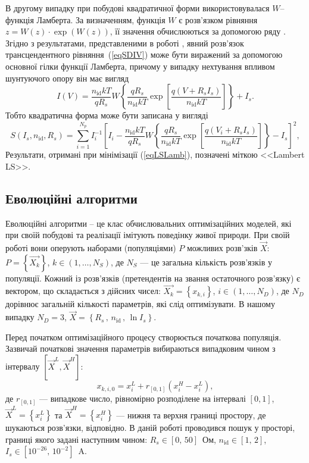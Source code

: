 В другому випадку при побудові квадратичної форми використовувалася $W$--функція Ламберта.
За визначенням, функція $W$ є розв'язком рівняння $z=W(z)\cdot\exp(W(z))$, її значення обчислюються за допомогою ряду \cite{LambertBook}.
Згідно з результатами, представленими в роботі \cite{Lambert_Jung}, явний розв'язок  трансцендентного рівняння~(\ref{eqSDIV}) може бути виражений за допомогою основної гілки функції Ламберта, причому у випадку нехтування впливом шунтуючого опору він має вигляд
\begin{equation}
\label{eqLam}
    I(V)=\frac{n_\mathrm{id}kT}{qR_s}W\left\{\frac{qR_s}{n_\mathrm{id}kT}
      \exp\left[\frac{q(V+R_sI_s)}{n_\mathrm{id}kT}\right]  \right\}+I_s.
\end{equation}
Тобто квадратична форма може бути записана у вигляді
\begin{equation}
\label{eqLSLamb}
S(I_s,n_\mathrm{id},R_s)=\sum_{i=1}^{N_p}I_i^{-1}\left[I_i-\frac{n_\mathrm{id}kT}{qR_s}W\left\{\frac{qR_s}{n_\mathrm{id}kT}
      \exp\left[\frac{q(V_i+R_sI_s)}{n_\mathrm{id}kT}\right]  \right\}-I_s\right]^2,
\end{equation}
Результати, отримані при мінімізації (\ref{eqLSLamb}), позначені міткою <<Lambert LS>>.


\subsection{Еволюційні алгоритми\label{subEA}}
Еволюційні алгоритми -- це клас обчислювальних оптимізаційних моделей, які при своїй побудові та реалізації імітують поведінку живої природи.
При своїй роботі вони оперують наборами (популяціями) $P$ можливих розв'зків
$\overrightarrow{X}$: $P=\left\{\overrightarrow{X_k}\right\}$, $k\in(1,\ldots, N_S)$,
де $N_S$ --- це загальна кількість розв'язків у популяції.
Кожний із розв'язків (претендентів на звання остаточного розв'язку) є вектором, що складається з дійсних чисел:
$\overrightarrow{X_k}=\left\{x_{k,i}\right\}$, $i\in(1,\ldots, N_D)$,
де
$N_D$ дорівнює загальній кількості параметрів, які слід оптимізувати.
В нашому випадку $N_D=3$, $\overrightarrow{X}=\left\{R_s\,,\,n_\mathrm{id}\,,\,\ln I_s\right\}$.

Перед початком оптимізаційного процесу створюється початкова популяція.
Зазвичай початкові значення параметрів вибираються випадковим чином з інтервалу
$[\overrightarrow{X}^{L}, \overrightarrow{X}^{H}]$:
\begin{equation}
\label{eqEAIn}
x_{k,i,0}=x_i^L+r_{[0,1]}(x_i^H-x_i^L),
\end{equation}
де
$r_{[0,1]}$ --- випадкове число, рівномірно розподілене на інтервалі $[0,1]$,
$\overrightarrow{X}^{L}=\left\{x_i^L\right\}$ та $\overrightarrow{X}^{H}=\left\{x_i^H\right\}$ ---
нижня та верхня границі простору, де шукаються розв'язки, відповідно.
В даній роботі проводився пошук у просторі, границі якого задані наступним чином:
$R_s\in[0,\,50]$~Ом, $n_\mathrm{id}\in[1,\,2]$, $I_s\in[10^{-26},\,10^{-2}]$~A.

